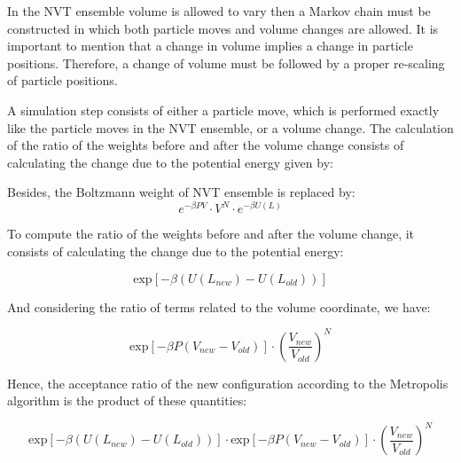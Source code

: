 \documentclass[12pt,letterpaper]{report}
\begin{document}
\begin{enumerate}
  	In the NVT ensemble volume is allowed to vary then a Markov chain must be constructed in which both particle moves
  	and volume changes are allowed. It is important to mention that a change in volume implies a change in particle positions. Therefore, a change of volume must be followed by a proper re-scaling of particle positions. 
  	
  	A simulation step consists of either a particle move, which is performed exactly like the particle moves in the NVT ensemble, or a volume change. The calculation of the ratio of the weights before and after the volume change consists of calculating the change due to the potential energy given by:    	
  	
  	Besides, the Boltzmann weight of NVT ensemble is replaced by:
  	$$
  	e^{-\beta P V }\cdot V^{N} \cdot e^{-\beta U(L) }
  	$$
  	
  	To compute the ratio of the weights before and after the volume change, it consists of calculating the change due to the potential energy: 
  	
  	$$
  	\text{exp}\left[ -\beta \left( U(L_{new})  - U (L_{old}) \right) \right]  	
  	$$
  	
  	And considering the ratio of terms related to the volume coordinate, we have: 
  	
  	$$
  	\text{exp}\left[ -\beta P(V_{new} - V_{old}) \right]
  	\cdot  \left( \dfrac{V_{new}}{V_{old}}\right)^{N}
  	$$
  	
  	Hence, the acceptance ratio of the new configuration according to the Metropolis algorithm is the product of these quantities: 
  	
  	$$
  	\text{exp}\left[ -\beta \left( U(L_{new})  - U (L_{old}) \right) \right]  
  	\cdot
  	\text{exp}\left[ -\beta P(V_{new} - V_{old}) \right]
  	\cdot  \left( \dfrac{V_{new}}{V_{old}}\right)^{N}
  	$$        	
  	  
  \end{enumerate}
\end{document}

